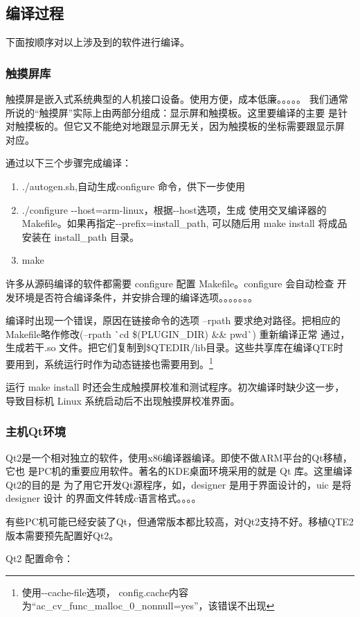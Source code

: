 \documentclass[nofonts]{ctexart}
\begin{document}
\subsection{编译过程}
	下面按顺序对以上涉及到的软件进行编译。
\subsubsection{触摸屏库}
	触摸屏是嵌入式系统典型的人机接口设备。使用方便，成本低廉。。。。。
我们通常所说的``触摸屏''实际上由两部分组成：显示屏和触摸板。这里要编译的主要
是针对触摸板的。但它又不能绝对地跟显示屏无关，因为触摸板的坐标需要跟显示屏
对应。

	通过以下三个步骤完成编译：
\begin{enumerate}\itemsep=-4pt
  \item ./autogen.sh,自动生成configure 命令，供下一步使用
  \item ./configure -{}-host=arm-linux，根据-{}-host选项，生成
		使用交叉编译器的 Makefile。如果再指定-{}-prefix=install\_path, 
可以随后用 make install 将成品安装在 install\_path 目录。
  \item make
\end{enumerate}
	许多从源码编译的软件都需要 configure 配置 Makefile。configure 会自动检查
开发环境是否符合编译条件，并安排合理的编译选项。。。。。。。

	编译时出现一个错误，原因在链接命令的选项 --rpath 要求绝对路径。把相应的
Makefile略作修改(--rpath \`{}cd \$(PLUGIN\_DIR) \&\& pwd\`{}) 重新编译正常
通过，生成若干.so 文件。把它们复制到\$QTEDIR/lib目录。这些共享库在编译QTE时
要用到，系统运行时作为动态链接也需要用到。\footnote{使用-{}-cache-file选项，
config.cache内容为``ac\_cv\_func\_malloc\_0\_nonnull=yes''，该错误不出现}

	运行 make install 时还会生成触摸屏校准和测试程序。初次编译时缺少这一步，
导致目标机 Linux 系统启动后不出现触摸屏校准界面。
\subsubsection{主机Qt环境}
	Qt2是一个相对独立的软件，使用x86编译器编译。即使不做ARM平台的Qt移植，它也
是PC机的重要应用软件。著名的KDE桌面环境采用的就是 Qt 库。这里编译Qt2的目的是
为了用它开发Qt源程序，如，designer 是用于界面设计的，uic 是将 designer 设计
的界面文件转成c语言格式。。。。

	有些PC机可能已经安装了Qt，但通常版本都比较高，对Qt2支持不好。移植QTE2
版本需要预先配置好Qt2。

	Qt2 配置命令：
\end{document}
